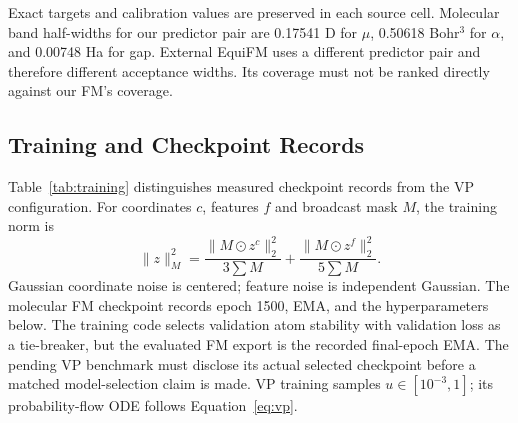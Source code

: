 \documentclass{article}
\begin{document}
Exact targets and calibration values are preserved in each source cell. Molecular band half-widths for our predictor pair are 0.17541 D for $\mu$, 0.50618 Bohr$^3$ for $\alpha$, and 0.00748 Ha for gap. External EquiFM uses a different predictor pair and therefore different acceptance widths. Its coverage must not be ranked directly against our FM's coverage.

\subsection{Training and Checkpoint Records}\label{app:training}
Table~\ref{tab:training} distinguishes measured checkpoint records from the VP configuration. For coordinates $c$, features $f$ and broadcast mask $M$, the training norm is
\[
\|z\|_M^2=\frac{\|M\odot z^c\|_2^2}{3\sum M}+\frac{\|M\odot z^f\|_2^2}{5\sum M}.
\]
Gaussian coordinate noise is centered; feature noise is independent Gaussian. The molecular FM checkpoint records epoch 1500, EMA, and the hyperparameters below. The training code selects validation atom stability with validation loss as a tie-breaker, but the evaluated FM export is the recorded final-epoch EMA. The pending VP benchmark must disclose its actual selected checkpoint before a matched model-selection claim is made. VP training samples $u\in[10^{-3},1]$; its probability-flow ODE follows Equation~\eqref{eq:vp}.
\end{document}
